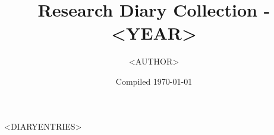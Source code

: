 \documentclass[letterpaper,11pt]{article}
\title{Research Diary Collection - <YEAR>}
\author{<AUTHOR>}
\date{Compiled \today}
\begin{document}
\tableofcontents
\thispagestyle{empty}
\newpage

<DIARYENTRIES>
\end{document}

